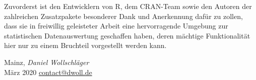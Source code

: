 Zuvorderst ist den Entwicklern von R, dem CRAN-Team sowie den Autoren der zahlreichen Zusatzpakete besonderer Dank und Anerkennung dafür zu zollen, dass sie in freiwillig geleisteter Arbeit eine hervorragende Umgebung zur statistischen Datenauswertung geschaffen haben, deren mächtige Funktionalität hier nur zu einem Bruchteil vorgestellt werden kann.

\vspace{\baselineskip}
\begin{flushright}\noindent
Mainz, \hfill \textit{Daniel Wollschläger}\\
März 2020 \hfill \url{contact@dwoll.de}\\
\end{flushright}
